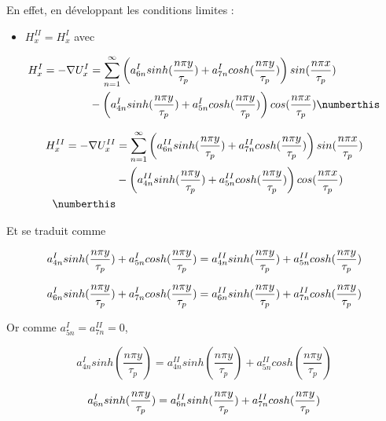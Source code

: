 En effet, en développant les conditions limites :

\begin{itemize}
    \item \textbf{$H_x^{II} = H_x^{I}$} avec
\end{itemize}

\begin{align*}
   H_x^I = -\nabla U_x^{I} &= \sum_{n=1}^\infty 
    \left(a_{6n}^Isinh(\frac{n\pi y}{\tau_p})+a_{7n}^Icosh(\frac{n\pi y}{\tau_p})\right)sin(\frac{n\pi x}{\tau_p})\\
    &-\left(a_{4n}^Isinh(\frac{n\pi y}{\tau_p})+a_{5n}^Icosh(\frac{n\pi y}{\tau_p})\right)cos(\frac{n\pi x}{\tau_p}) \numberthis
\end{align*}

\begin{align*}
    H_x^{II} = -\nabla U_x^{II} &= \sum_{n=1}^\infty 
    \left(a_{6n}^{II}sinh(\frac{n\pi y}{\tau_p})+a_{7n}^{II}cosh(\frac{n\pi y}{\tau_p})\right)sin(\frac{n\pi x}{\tau_p})\\
    &-\left(a_{4n}^{II}sinh(\frac{n\pi y}{\tau_p})+a_{5n}^{II}cosh(\frac{n\pi y}{\tau_p})\right)cos(\frac{n\pi x}{\tau_p})\\ \numberthis
\end{align*}

Et se traduit comme

\begin{equation}
    a_{4n}^Isinh(\frac{n\pi y}{\tau_p})+a_{5n}^Icosh(\frac{n\pi y}{\tau_p}) =a_{4n}^{II}sinh(\frac{n\pi y}{\tau_p})+a_{5n}^{II}cosh(\frac{n\pi y}{\tau_p})\\
\end{equation}

\begin{equation}
    a_{6n}^Isinh(\frac{n\pi y}{\tau_p})+a_{7n}^Icosh(\frac{n\pi y}{\tau_p})= a_{6n}^{II}sinh(\frac{n\pi y}{\tau_p})+a_{7n}^{II}cosh(\frac{n\pi y}{\tau_p})\\
\end{equation}

Or comme $a_{5n}^I=a_{7n}^{II}=0$,

\begin{equation}
    a_{4n}^Isinh(\frac{n\pi y}{\tau_p}) =a_{4n}^{II}sinh(\frac{n\pi y}{\tau_p})+a_{5n}^{II}cosh(\frac{n\pi y}{\tau_p})
\end{equation}

\begin{equation}
    a_{6n}^Isinh(\frac{n\pi y}{\tau_p})= a_{6n}^{II}sinh(\frac{n\pi y}{\tau_p})+a_{7n}^{II}cosh(\frac{n\pi y}{\tau_p})\\
\end{equation}



